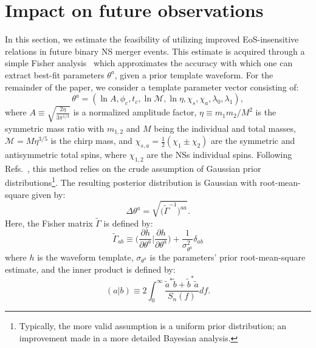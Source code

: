 \documentclass[prd,twocolumn,nofootinbib,superscriptaddress,amsmath,amssymb]{revtex4-1}
\begin{document}
\section{Impact on future observations}\label{sec:observations}
In this section, we estimate the feasibility of utilizing improved EoS-insensitive relations in future binary NS merger events.
This estimate is acquired through a simple Fisher analysis~\cite{Finn:Fisher,Cutler:Fisher} which approximates the accuracy with which one can extract best-fit parameters $\theta^a$, given a prior template waveform.
For the remainder of the paper, we consider a template parameter vector consisting of:
\begin{equation}\label{eq:template}
\theta^a=(\ln{A},\phi_c,t_c,\ln{\mathcal{M}},\ln{\mathcal{\eta}},\chi_s,\chi_a,\lambda_0, \lambda_1),
\end{equation}
where $A \equiv \sqrt{\frac{2 \eta}{3 \pi^{1/3}}}$ is a normalized amplitude factor, $\eta \equiv m_1 m_2/M^2$ is the symmetric mass ratio with $m_{1,2}$ and $M$ being the individual and total masses, $\mathcal{M}=M \eta^{3/5}$ is the chirp mass, and $\chi_{s,a}=\frac{1}{2}(\chi_1\pm\chi_2)$ are the symmetric and antisymmetric total spins, where $\chi_{1,2}$ are the NSs individual spins. 
Following Refs.~\cite{Cutler:Fisher,Berti:Fisher,Poisson:Fisher}, this method relies on the crude assumption of Gaussian prior distributions\footnote{Typically, the more valid assumption is a uniform prior distribution; an improvement made in a more detailed Bayesian analysis.}.
The resulting posterior distribution is Gaussian with root-mean-square given by:
\begin{equation}
\Delta \theta^a=\sqrt{\Big( \tilde{\Gamma}^{-1}\Big)^{aa}}.
\end{equation}
Here, the Fisher matrix $\tilde{\Gamma}$ is defined by:
\begin{equation}
\tilde{\Gamma}_{ab} \equiv \Big( \frac{\partial h}{\partial \theta^a} \Big| \frac{\partial h}{\partial \theta^a}\Big) + \frac{1}{\sigma_{\theta^a}^2} \delta_{ab}
\end{equation}
where $h$ is the waveform template, $\sigma_{\theta^a}$ is the parameters' prior root-mean-square estimate, and the inner product is defined by:
\begin{equation}
(a|b) \equiv 2 \int^{\infty}_0\frac{\tilde{a}^*\tilde{b}+\tilde{b}^*\tilde{a}}{S_n(f)}df.
\end{equation}
\end{document}
